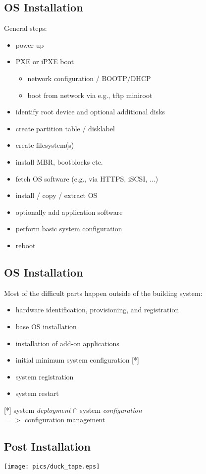 \documentclass[xga]{xdvislides}
\begin{document}
\subsection{OS Installation}
General steps:
\begin{itemize}
	\item power up
	\item PXE or iPXE boot
	\begin{itemize}
		\item network configuration / BOOTP/DHCP
		\item boot from network via e.g., tftp miniroot
	\end{itemize}
	\item identify root device and optional additional disks
	\item create partition table / disklabel
	\item create filesystem(s)
	\item install MBR, bootblocks etc.
	\item fetch OS software (e.g., via HTTPS, iSCSI, ...)
	\item install / copy / extract OS
	\item optionally add application software
	\item perform basic system configuration
	\item reboot
\end{itemize}


\subsection{OS Installation}
Most of the difficult parts happen outside of the
building system:
\begin{itemize}
	\item hardware identification, provisioning, and registration
	\item base OS installation
	\item installation of add-on applications
	\item initial minimum system configuration [*]
	\item system registration
	\item system restart
\end{itemize}
\vspace*{\fill}
[*] system {\em deployment} $\cap$ system {\em configuration} \\
$ => $ configuration management

\subsection{Post Installation}
\vspace*{\fill}
\begin{center}
	\texttt{[image: pics/duck\_tape.eps]}
\end{center}
\vspace*{\fill}
\end{document}
